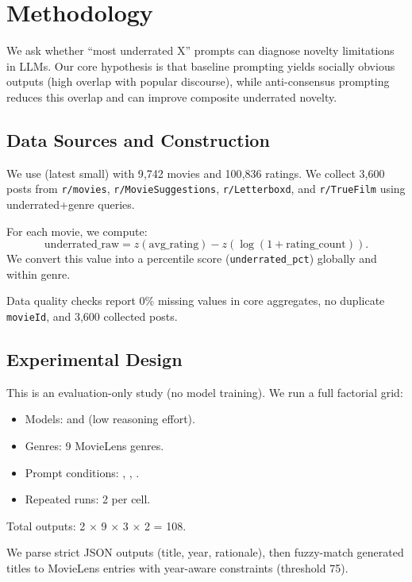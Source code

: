 \section{Methodology}
\label{sec:methodology}
 We ask whether ``most underrated X'' prompts can diagnose novelty limitations in LLMs. Our core hypothesis is that baseline prompting yields socially obvious outputs (high overlap with popular \reddit discourse), while anti-consensus prompting reduces this overlap and can improve composite underrated novelty.

\subsection{Data Sources and Construction}
We use \movielens (latest small) with 9{,}742 movies and 100{,}836 ratings. We collect 3{,}600 \reddit posts from \texttt{r/movies}, \texttt{r/MovieSuggestions}, \texttt{r/Letterboxd}, and \texttt{r/TrueFilm} using underrated+genre queries.

For each movie, we compute:
\begin{equation}
\text{underrated\_raw} = z(\text{avg\_rating}) - z(\log(1+\text{rating\_count})).
\end{equation}
We convert this value into a percentile score (\texttt{underrated\_pct}) globally and within genre.

Data quality checks report 0\% missing values in core aggregates, no duplicate \texttt{movieId}, and 3{,}600 collected posts.

\subsection{Experimental Design}
This is an evaluation-only study (no model training). We run a full factorial grid:
\begin{itemize}
    \item Models: \gptfourone and \gptfive (low reasoning effort).
    \item Genres: 9 MovieLens genres.
    \item Prompt conditions: \baseline, \anti, \antir.
    \item Repeated runs: 2 per cell.
\end{itemize}
Total outputs: 2 $\times$ 9 $\times$ 3 $\times$ 2 = 108.

We parse strict JSON outputs (title, year, rationale), then fuzzy-match generated titles to MovieLens entries with year-aware constraints (threshold 75).

